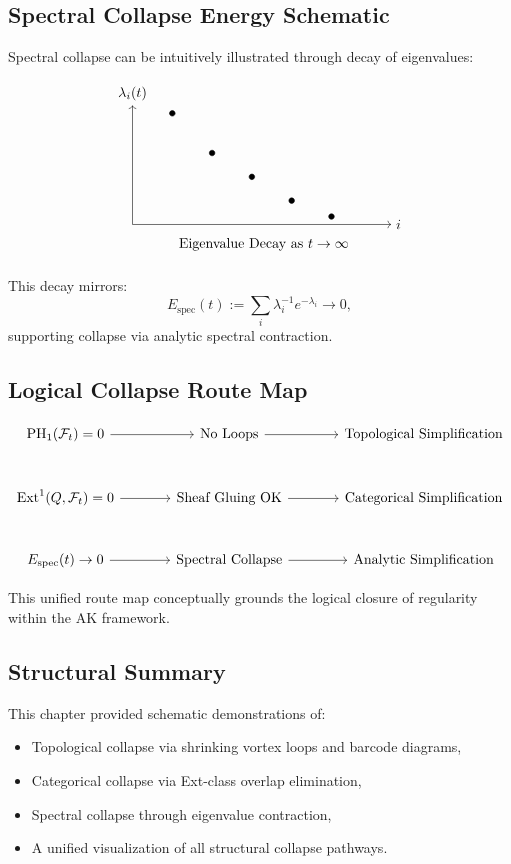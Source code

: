 \documentclass[11pt]{article}
\begin{document}
\subsection{Spectral Collapse Energy Schematic}

Spectral collapse can be intuitively illustrated through decay of eigenvalues:

\[
\begin{tikzpicture}
\draw[->] (0,0) -- (6.5,0) node[right] {\( i \)};
\draw[->] (0,0) -- (0,3) node[above] {\( \lambda_i(t) \)};
\foreach \x/\y in {1/2.8, 2/1.8, 3/1.2, 4/0.6, 5/0.2}
  \filldraw (\x,\y) circle (2pt);
\node at (3.3, -0.5) {Eigenvalue Decay as \( t \to \infty \)};
\end{tikzpicture}
\]

This decay mirrors:
\[
E_{\mathrm{spec}}(t) := \sum_i \lambda_i^{-1} e^{-\lambda_i} \to 0,
\]
supporting collapse via analytic spectral contraction.

\subsection{Logical Collapse Route Map}

\[
\begin{tikzcd}[row sep=large, column sep=large]
\mathrm{PH}_1(\mathcal{F}_t) = 0 \arrow[r] &
\text{No Loops} \arrow[r] &
\text{Topological Simplification}
\\
\mathrm{Ext}^1(Q, \mathcal{F}_t) = 0 \arrow[r] &
\text{Sheaf Gluing OK} \arrow[r] &
\text{Categorical Simplification}
\\
E_{\mathrm{spec}}(t) \to 0 \arrow[r] &
\text{Spectral Collapse} \arrow[r] &
\text{Analytic Simplification}
\end{tikzcd}
\]

This unified route map conceptually grounds the logical closure of regularity within the AK framework.

\subsection{Structural Summary}

This chapter provided schematic demonstrations of:
\begin{itemize}
  \item Topological collapse via shrinking vortex loops and barcode diagrams,
  \item Categorical collapse via Ext-class overlap elimination,
  \item Spectral collapse through eigenvalue contraction,
  \item A unified visualization of all structural collapse pathways.
\end{itemize}
\end{document}
